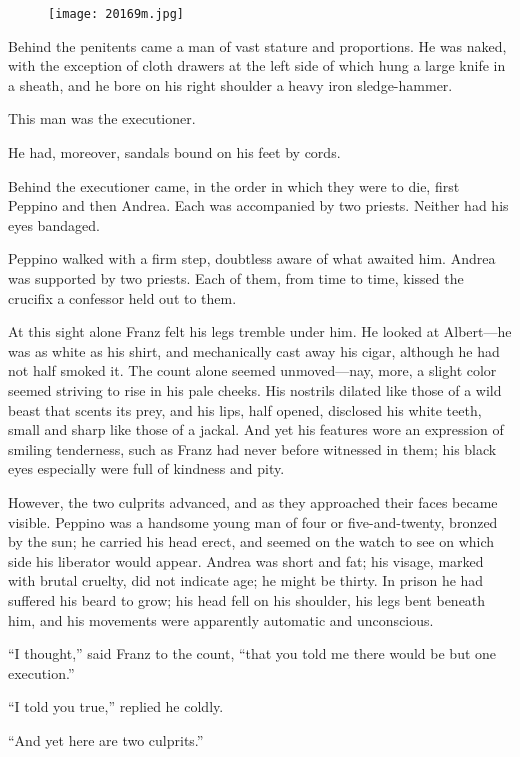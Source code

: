 \begin{figure}[ht]
\texttt{[image: 20169m.jpg]}
\end{figure}

Behind the penitents came a man of vast stature and proportions. He was
naked, with the exception of cloth drawers at the left side of which
hung a large knife in a sheath, and he bore on his right shoulder a
heavy iron sledge-hammer.

This man was the executioner.

He had, moreover, sandals bound on his feet by cords.

Behind the executioner came, in the order in which they were to die,
first Peppino and then Andrea. Each was accompanied by two priests.
Neither had his eyes bandaged.

Peppino walked with a firm step, doubtless aware of what awaited him.
Andrea was supported by two priests. Each of them, from time to time,
kissed the crucifix a confessor held out to them.

At this sight alone Franz felt his legs tremble under him. He looked at
Albert—he was as white as his shirt, and mechanically cast away his
cigar, although he had not half smoked it. The count alone seemed
unmoved—nay, more, a slight color seemed striving to rise in his pale
cheeks. His nostrils dilated like those of a wild beast that scents its
prey, and his lips, half opened, disclosed his white teeth, small and
sharp like those of a jackal. And yet his features wore an expression
of smiling tenderness, such as Franz had never before witnessed in
them; his black eyes especially were full of kindness and pity.

However, the two culprits advanced, and as they approached their faces
became visible. Peppino was a handsome young man of four or
five-and-twenty, bronzed by the sun; he carried his head erect, and
seemed on the watch to see on which side his liberator would appear.
Andrea was short and fat; his visage, marked with brutal cruelty, did
not indicate age; he might be thirty. In prison he had suffered his
beard to grow; his head fell on his shoulder, his legs bent beneath
him, and his movements were apparently automatic and unconscious.

“I thought,” said Franz to the count, “that you told me there would be
but one execution.”

“I told you true,” replied he coldly.

“And yet here are two culprits.”


